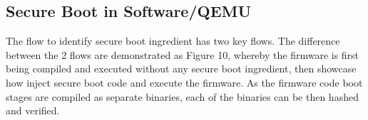 \documentclass[a4paper,fleqn]{cas-dc}
\begin{document}

\subsection{ Secure Boot in Software/QEMU}
The flow to identify secure boot ingredient has two key flows. The difference between the 2 flows are demonstrated as Figure 10, whereby the firmware is first being compiled and executed without any secure boot ingredient, then showcase how inject secure boot code and execute the firmware. As the firmware code boot stages are compiled as separate binaries, each of the binaries can be then hashed and verified.
\end{document}
